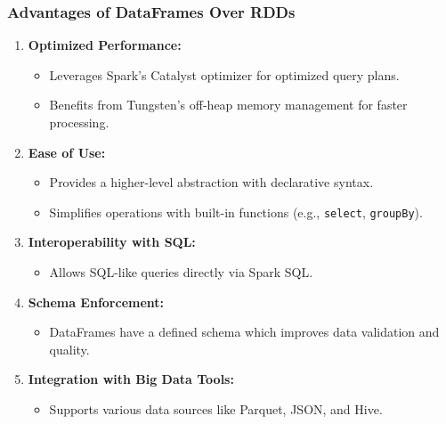 \documentclass[aspectratio=169]{beamer}
\begin{document}
\begin{frame}
    \frametitle{Advantages of DataFrames Over RDDs}
    \begin{enumerate}
        \item \textbf{Optimized Performance:}
            \begin{itemize}
                \item Leverages Spark's Catalyst optimizer for optimized query plans.
                \item Benefits from Tungsten's off-heap memory management for faster processing.
            \end{itemize}
        
        \item \textbf{Ease of Use:}
            \begin{itemize}
                \item Provides a higher-level abstraction with declarative syntax.
                \item Simplifies operations with built-in functions (e.g., \texttt{select}, \texttt{groupBy}).
            \end{itemize}
        
        \item \textbf{Interoperability with SQL:}
            \begin{itemize}
                \item Allows SQL-like queries directly via Spark SQL.
            \end{itemize}
        
        \item \textbf{Schema Enforcement:}
            \begin{itemize}
                \item DataFrames have a defined schema which improves data validation and quality.
            \end{itemize}
        
        \item \textbf{Integration with Big Data Tools:}
            \begin{itemize}
                \item Supports various data sources like Parquet, JSON, and Hive.
            \end{itemize}
    \end{enumerate}
\end{frame}
\end{document}
